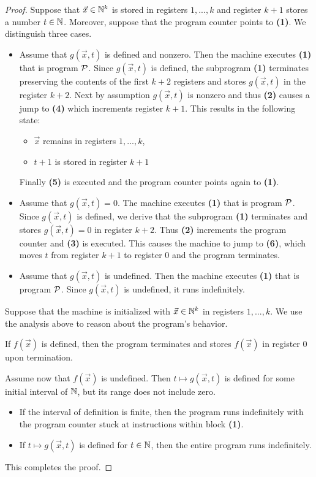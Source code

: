 \documentclass[10pt]{amsart}
\begin{document}
\begin{proof}
	Suppose that $\vec{x} \in {\mathbb N}^k$ is stored in registers $1,...,k$ and register $k + 1$ stores a number $t \in {\mathbb N}$. Moreover, suppose that the program counter points to \textbf{(1)}. We distinguish three cases.
	\begin{itemize}
		\item Assume that $g(\vec{x},t)$ is defined and nonzero. Then the machine executes \textbf{(1)} that is program ${\mathcal P}$. Since $g(\vec{x},t)$ is defined, the subprogram \textbf{(1)} terminates preserving the contents of the first $k + 2$ registers and stores $g(\vec{x},t)$ in the register $k + 2$. Next by assumption $g(\vec{x},t)$ is nonzero and thus \textbf{(2)} causes a jump to \textbf{(4)} which increments register $k + 1$. This results in the following state:
		      \begin{itemize}
			      \item[] $\vec{x}$ remains in registers $1,...,k$,
			      \item[] $t + 1$ is stored in register $k + 1$
		      \end{itemize}
		      Finally \textbf{(5)} is executed and the program counter points again to \textbf{(1)}.
		\item Assume that $g(\vec{x},t) = 0$. The machine executes \textbf{(1)} that is program ${\mathcal P}$. Since $g(\vec{x},t)$ is defined, we derive that the subprogram \textbf{(1)} terminates and stores $g(\vec{x},t) = 0$ in register $k + 2$. Thus \textbf{(2)} increments the program counter and \textbf{(3)} is executed. This causes the machine to jump to \textbf{(6)}, which moves $t$ from register $k + 1$ to register $0$ and the program terminates.
		\item Assume that $g(\vec{x},t)$ is undefined. Then the machine executes \textbf{(1)} that is program ${\mathcal P}$. Since $g(\vec{x},t)$ is undefined, it runs indefinitely.
	\end{itemize}
	Suppose that the machine is initialized with $\vec{x} \in {\mathbb N}^k$ in registers $1,...,k$. We use the analysis above to reason about the program's behavior.

	If $f(\vec{x})$ is defined, then the program terminates and stores $f(\vec{x})$ in register $0$ upon termination.

	Assume now that $f(\vec{x})$ is undefined. Then $t \mapsto g(\vec{x},t)$ is defined for some initial interval of ${\mathbb N}$, but its range does not include zero.
	\begin{itemize}
		\item If the interval of definition is finite, then the program runs indefinitely with the program counter stuck at instructions within block \textbf{(1)}.
		\item If $t \mapsto g(\vec{x},t)$ is defined for $t \in {\mathbb N}$, then the entire program runs indefinitely.
	\end{itemize}
	This completes the proof.
\end{proof}
\end{document}

